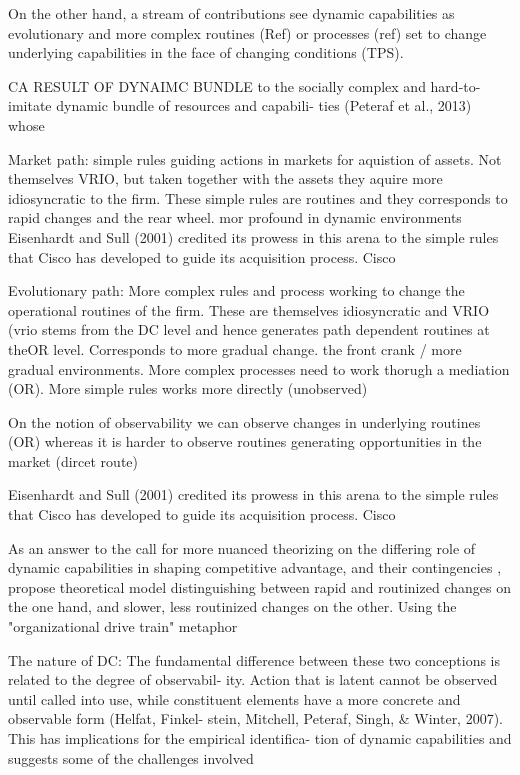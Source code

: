 On the other hand, a stream of contributions see dynamic capabilities as evolutionary and
more complex routines (Ref) or processes (ref) set to change underlying capabilities in
the face of changing conditions (TPS).  

CA RESULT OF DYNAIMC BUNDLE
to the socially complex and hard-to- imitate dynamic bundle of resources and capabili- ties (Peteraf et al., 2013) whose



Market path: simple rules guiding actions in markets for aquistion of assets. Not
themselves VRIO, but taken together with the assets they aquire more idiosyncratic to the
firm. These simple rules are routines and they corresponds to rapid changes and the rear
wheel. mor profound in dynamic environments
Eisenhardt and Sull (2001) credited its prowess in this arena to the simple rules that Cisco has developed to guide its acquisition process. Cisco

Evolutionary path: More complex rules and process working to change the operational
routines of the firm. These are themselves idiosyncratic and VRIO (vrio stems from the DC
level and hence generates path dependent routines at theOR level. Corresponds to more
gradual change. the front crank / more gradual environments. More complex processes need
to work thorugh a mediation (OR). More simple rules works more directly (unobserved)

On the notion of observability we can observe changes in underlying routines (OR) whereas
it is harder to observe routines generating opportunities in the market (dircet route)


Eisenhardt and Sull (2001) credited its prowess in this arena to the simple rules that
Cisco has developed to guide its acquisition process. Cisco

As an answer to the call for more nuanced theorizing on the differing role of dynamic
capabilities in shaping competitive advantage, and their contingencies
\citep{Peteraf2013}, \cite{DiStefano2014} propose theoretical model distinguishing between
rapid and routinized changes on the one hand, and slower, less routinized changes on the
other. Using the "organizational drive train" metaphor


The nature of DC: 
The fundamental difference between these two conceptions is related to the degree of observabil- ity. Action that is latent cannot be observed until called into use, while constituent elements have a more concrete and observable form (Helfat, Finkel- stein, Mitchell, Peteraf, Singh, & Winter, 2007). This has implications for the empirical identifica- tion of dynamic capabilities and suggests some of the challenges involved

